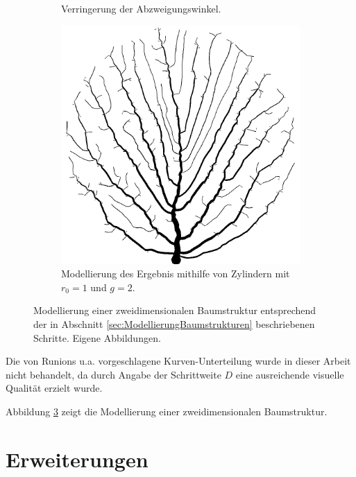 \begin{figure} [hbtp]
\begin{subfigure}[t]{.4\textwidth}
		\caption{Verringerung der Abzweigungswinkel.}
		\label{subfig:SCA_Extended3}
	\end{subfigure}
	\hspace{.1\textwidth}
	\begin{subfigure}[t]{.4\textwidth}
		\centering
		\includegraphics[width=\linewidth]{images/SCA_Extended4.png}
		\caption{Modellierung des Ergebnis mithilfe von Zylindern mit $r_0 = 1$ und $g=2$.}
		\label{subfig:SCA_Extended4}
	\end{subfigure}
	\caption{Modellierung einer zweidimensionalen Baumstruktur entsprechend der in Abschnitt \ref{sec:ModellierungBaumstrukturen} beschriebenen Schritte. Eigene Abbildungen.}
	\label{fig:SCA_Extended}
\end{figure}

Die von Runions u.a. \cite{SpaceColonizationAlgorithm:07} vorgeschlagene Kurven-Unterteilung \cite[Abschn. 2]{SpaceColonizationAlgorithm:07} wurde in dieser Arbeit nicht behandelt, da durch Angabe der Schrittweite $D$ eine ausreichende visuelle Qualität erzielt wurde.

Abbildung \ref{fig:SCA_Extended} zeigt die Modellierung einer zweidimensionalen Baumstruktur.

\section{Erweiterungen} \label{sec:SCA_Erweiterungen}

